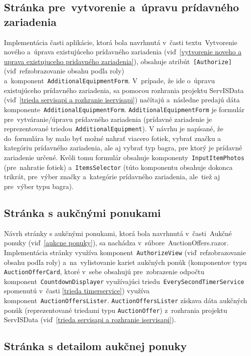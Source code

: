 \subsection{Stránka pre~vytvorenie a~úpravu prídavného zariadenia}

Implementácia časti aplikácie, ktorá bola navrhnutá v~časti textu~Vytvorenie nového a~úprava existujúceho prídavného zariadenia (viď~\ref{vytvorenie noveho a uprava existujuceho pridavného zariadenia}), obsahuje atribút~\verb|[Authorize]| (viď~ref{zobrazovanie obsahu podľa roly}) a~komponent~\verb|AdditionalEquipmentForm|. V~prípade, že ide o~úpravu existujúceho prídavného zariadenia, sa pomocou rozhrania projektu ServISData (viď~\ref{trieda servisapi a rozhranie iservisapi}) načítajú a~následne predajú dáta komponente~\verb|AdditionalEquipmentForm|. \verb|AdditionalEquipmentForm| je formulár pre~vytváranie/úpravu prídavného zariadenia (prídavné zariadenie je reprezentované triedou~\verb|AdditionalEquipment|). V návrhu je napísané, že do~formulára by malo byť možné nahrať viacero fotiek, vybrať značku a kategóriu prídavného zariadenia, ale aj vybrať typ bagra, pre ktorý je prídavné zariadenie určené. Kvôli tomu formulár obsahuje komponenty~\verb|InputItemPhotos| (pre~nahratie fotiek) a~\verb|ItemsSelector| (túto komponentu obsahuje dokonca trikrát, pre~výber značky a~kategórie prídavného zariadenia, ale~tiež aj pre~výber typu bagra).

\subsection{Stránka s aukčnými ponukami}

Návrh stránky s aukčnými ponukami, ktorá bola navrhnutá v~časti~Aukčné ponuky (viď~\ref{aukcne ponuky}), sa nachádza v~súbore~AuctionOffers.razor. Implementácia stránky využíva komponent~\verb|AuthorizeView| (viď~ref{zobrazovanie obsahu podľa roly}) a~na~vylistovanie kariet aukčných ponúk (komponentov typu \verb|AuctionOfferCard|, ktoré v~sebe obsahujú pre~zobrazenie odpočtu komponent~\verb|CountdownDisplayer| využívajúci triedu~\verb|EverySecondTimerService| spomenutú v~časti \ref{trieda timerservice}) využíva komponent~\verb|AuctionOffersLister|. \verb|AuctionOffersLister| získava dáta aukčných ponúk (reprezentované triedami typu \verb|AuctionOffer|) z~rozhrania projektu ServISData (viď~\ref{trieda servisapi a rozhranie iservisapi}).

\subsection{Stránka s detailom aukčnej ponuky}

